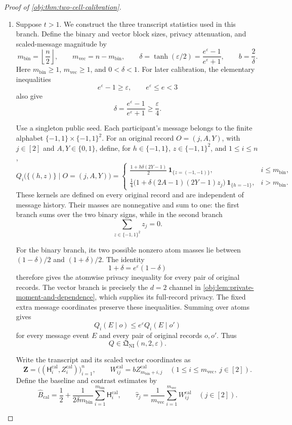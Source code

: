 \begin{proof}[Proof of \cref{obj:thm:two-cell-calibration}]
\begin{enumerate}
\item
Suppose \(t>1\). We construct the three transcript statistics used in this branch. Define the binary and vector block sizes, privacy attenuation, and scaled-message magnitude by
\[
m_{\mathrm{bin}}=\left\lfloor\frac n2\right\rfloor,
\qquad
m_{\mathrm{vec}}=n-m_{\mathrm{bin}},
\qquad
\delta=\tanh(\varepsilon/2)
=\frac{e^\varepsilon-1}{e^\varepsilon+1},
\qquad
b=\frac2\delta.
\]
Here \(m_{\mathrm{bin}}\ge1\), \(m_{\mathrm{vec}}\ge1\), and \(0<\delta<1\).
For later calibration, the elementary inequalities
\[
e^\varepsilon-1\ge\varepsilon,
\qquad e^\varepsilon\le e<3
\]
also give
\[
\delta
=\frac{e^\varepsilon-1}{e^\varepsilon+1}
\ge\frac{\varepsilon}{4}.
\]

Use a singleton public seed. Each participant's message belongs to the finite alphabet
\(\{-1,1\}\times\{-1,1\}^{2}\). For an original record
\(O=(j,A,Y)\), with \(j\in[2]\) and \(A,Y\in\{0,1\}\), define, for
\(h\in\{-1,1\}\), \(z\in\{-1,1\}^{2}\), and \(1\le i\le n\),
\[
Q_i\bigl(\{(h,z)\}\mid O=(j,A,Y)\bigr)
=
\begin{cases}
\displaystyle
\frac{1+h\delta(2Y-1)}2\,
\mathbf1_{\{z=(-1,-1)\}},
& i\le m_{\mathrm{bin}},\\[6pt]
\displaystyle
\frac14\bigl(1+\delta(2A-1)(2Y-1)z_j\bigr)\,
\mathbf1_{\{h=-1\}},
& i>m_{\mathrm{bin}}.
\end{cases}
\]
These kernels are defined on every original record and are independent of message history. Their masses are nonnegative and sum to one: the first branch sums over the two binary signs, while in the second branch
\[
\sum_{z\in\{-1,1\}^{2}}z_j=0.
\]

For the binary branch, its two possible nonzero atom masses lie between
\((1-\delta)/2\) and \((1+\delta)/2\). The identity
\[
1+\delta=e^\varepsilon(1-\delta)
\]
therefore gives the atomwise privacy inequality for every pair of original records. The vector branch is precisely the \(d=2\) channel in
\cref{obj:lem:private-moment-and-dependence}, which supplies its full-record privacy. The fixed extra message coordinates preserve these inequalities. Summing over atoms gives
\[
Q_i(E\mid o)\le e^\varepsilon Q_i(E\mid o')
\]
for every message event \(E\) and every pair of original records \(o,o'\). Thus
\[
Q\in\mathfrak Q_{\mathrm{NI}}(n,2,\varepsilon).
\]

Write the transcript and its scaled vector coordinates as
\[
\mathbf Z
=\bigl((\mathsf H_i^{\mathrm{cal}},Z_i^{\mathrm{cal}})\bigr)_{i=1}^{n},
\qquad
W_{ij}^{\mathrm{cal}}
=bZ_{m_{\mathrm{bin}}+i,j}^{\mathrm{cal}}
\quad
(1\le i\le m_{\mathrm{vec}},\ j\in[2]).
\]
Define the baseline and contrast estimates by
\[
\widehat B_{\mathrm{cal}}
=\frac12+
\frac1{2\delta m_{\mathrm{bin}}}
\sum_{i=1}^{m_{\mathrm{bin}}}\mathsf H_i^{\mathrm{cal}},
\qquad
\widehat\tau_j
=\frac1{m_{\mathrm{vec}}}
\sum_{i=1}^{m_{\mathrm{vec}}}W_{ij}^{\mathrm{cal}}
\quad(j\in[2]).
\]


\end{enumerate}
\end{proof}
